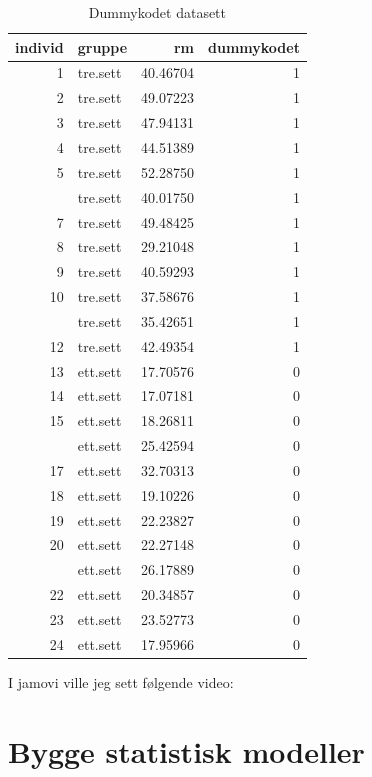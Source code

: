\documentclass[
]{book}
\begin{document}
\begin{table}

\caption{\label{tab:unnamed-chunk-4}Dummykodet datasett}
\centering
\begin{tabular}[t]{rlrr}
\toprule
individ & gruppe & rm & dummykodet\\
\midrule
1 & tre.sett & 40.46704 & 1\\
2 & tre.sett & 49.07223 & 1\\
3 & tre.sett & 47.94131 & 1\\
4 & tre.sett & 44.51389 & 1\\
5 & tre.sett & 52.28750 & 1\\
\addlinespace
6 & tre.sett & 40.01750 & 1\\
7 & tre.sett & 49.48425 & 1\\
8 & tre.sett & 29.21048 & 1\\
9 & tre.sett & 40.59293 & 1\\
10 & tre.sett & 37.58676 & 1\\
\addlinespace
11 & tre.sett & 35.42651 & 1\\
12 & tre.sett & 42.49354 & 1\\
13 & ett.sett & 17.70576 & 0\\
14 & ett.sett & 17.07181 & 0\\
15 & ett.sett & 18.26811 & 0\\
\addlinespace
16 & ett.sett & 25.42594 & 0\\
17 & ett.sett & 32.70313 & 0\\
18 & ett.sett & 19.10226 & 0\\
19 & ett.sett & 22.23827 & 0\\
20 & ett.sett & 22.27148 & 0\\
\addlinespace
21 & ett.sett & 26.17889 & 0\\
22 & ett.sett & 20.34857 & 0\\
23 & ett.sett & 23.52773 & 0\\
24 & ett.sett & 17.95966 & 0\\
\bottomrule
\end{tabular}
\end{table}

I jamovi ville jeg sett følgende video:

\hypertarget{bygge-statistisk-modeller}{%
\chapter{Bygge statistisk modeller}\label{bygge-statistisk-modeller}}
\end{document}

